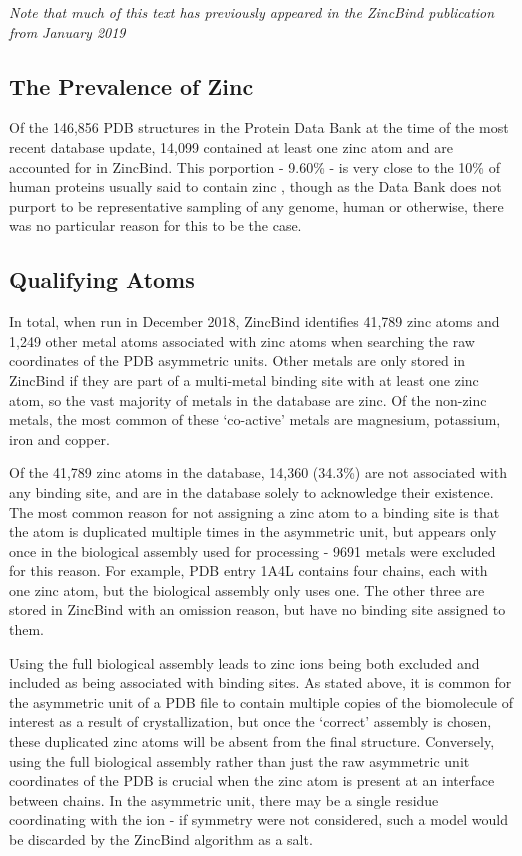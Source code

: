 \emph{Note that much of this text has previously appeared in the ZincBind publication from January 2019}

\subsection{The Prevalence of Zinc}

Of the 146,856 PDB structures in the Protein Data Bank at the time of the most recent database update, 14,099 contained at least one zinc atom and are accounted for in ZincBind. This porportion - 9.60\% - is very close to the 10\% of human proteins usually said to contain zinc , though as the Data Bank does not purport to be representative sampling of any genome, human or otherwise, there was no particular reason for this to be the case.

\subsection{Qualifying Atoms}

In total, when run in December 2018, ZincBind identifies 41,789 zinc atoms and 1,249 other metal atoms associated with zinc atoms when searching the raw coordinates of the PDB asymmetric units. Other metals are only stored in ZincBind if they are part of a multi-metal binding site with at least one zinc atom, so the vast majority of metals in the database are zinc. Of the non-zinc metals, the most common of these `co-active' metals are magnesium, potassium, iron and copper.

Of the 41,789 zinc atoms in the database, 14,360 (34.3\%) are not associated with any binding site, and are in the database solely to acknowledge their existence. The most common reason for not assigning a zinc atom to a binding site is that the atom is duplicated multiple times in the asymmetric unit, but appears only once in the biological assembly used for processing - 9691 metals were excluded for this reason. For example, PDB entry 1A4L contains four chains, each with one zinc atom, but the biological assembly only uses one. The other three are stored in ZincBind with an omission reason, but have no binding site assigned to them.

Using the full biological assembly leads to zinc ions being both excluded and included as being associated with binding sites. As stated above, it is common for the asymmetric unit of a PDB file to contain multiple copies of the biomolecule of interest as a result of crystallization, but once the `correct' assembly is chosen, these duplicated zinc atoms will be absent from the final structure. Conversely, using the full biological assembly rather than just the raw asymmetric unit coordinates of the PDB is crucial when the zinc atom is present at an interface between chains. In the asymmetric unit, there may be a single residue coordinating with the ion - if symmetry were not considered, such a model would be discarded by the ZincBind algorithm as a salt.

